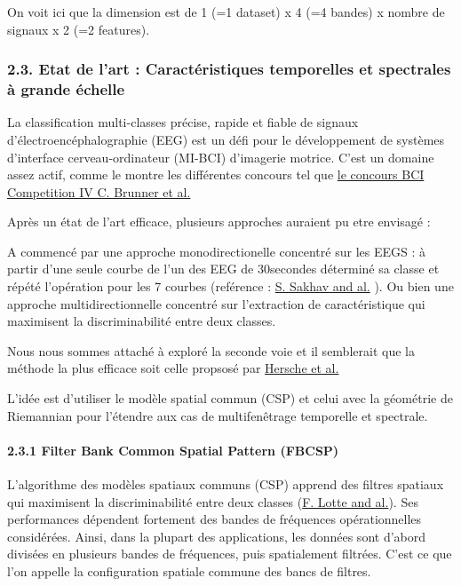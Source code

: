 \documentclass[11pt]{article}
\begin{document}
    On voit ici que la dimension est de 1 (=1 dataset) x 4 (=4 bandes) x
nombre de signaux x 2 (=2 features).

    \subsubsection{2.3. Etat de l'art : Caractéristiques temporelles et
spectrales à grande
échelle}\label{etat-de-lart-caractuxe9ristiques-temporelles-et-spectrales-uxe0-grande-uxe9chelle}

    La classification multi-classes précise, rapide et fiable de signaux
d'électroencéphalographie (EEG) est un défi pour le développement de
systèmes d'interface cerveau-ordinateur (MI-BCI) d'imagerie motrice.
C'est un domaine assez actif, comme le montre les différentes concours
tel que \href{http://bnci-horizon-2020.eu/database/data-sets}{le
concours BCI Competition IV C. Brunner et al.}

Après un état de l'art efficace, plusieurs approches auraient pu etre
envisagé :

A commencé par une approche monodirectionelle concentré sur les EEGS : à
partir d'une seule courbe de l'un des EEG de 30secondes déterminé sa
classe et répété l'opération pour les 7 courbes (reférence :
\href{https://ieeexplore.ieee.org/document/7362882}{S. Sakhav and al.}
). Ou bien une approche multidirectionnelle concentré sur l'extraction
de caractéristique qui maximisent la discriminabilité entre deux
classes.

Nous nous sommes attaché à exploré la seconde voie et il semblerait que
la méthode la plus efficace soit celle propsosé par
\href{https://arxiv.org/abs/1806.06823}{Hersche et al.}

L'idée est d'utiliser le modèle spatial commun (CSP) et celui avec la
géométrie de Riemannian pour l'étendre aux cas de multifenêtrage
temporelle et spectrale.

    \paragraph{2.3.1 Filter Bank Common Spatial Pattern
(FBCSP)}\label{filter-bank-common-spatial-pattern-fbcsp}

    L'algorithme des modèles spatiaux communs (CSP) apprend des filtres
spatiaux qui maximisent la discriminabilité entre deux classes
(\href{https://ieeexplore.ieee.org/document/5593210}{F. Lotte and al.}).
Ses performances dépendent fortement des bandes de fréquences
opérationnelles considérées. Ainsi, dans la plupart des applications,
les données sont d'abord divisées en plusieurs bandes de fréquences,
puis spatialement filtrées. C'est ce que l'on appelle la configuration
spatiale commune des bancs de filtres.
\end{document}
